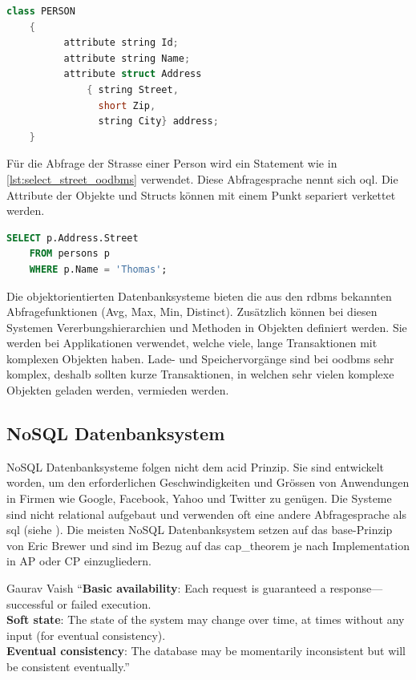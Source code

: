 \begin{lstlisting}[language=C++, caption=Objektdefinition in objektorientierem Datenbanksystem, label=lst:table_definition_oodbms]  
    class PERSON
    {
          attribute string Id;
          attribute string Name;
          attribute struct Address
              { string Street,
                short Zip,
                string City} address;
    }
\end{lstlisting}

Für die Abfrage der Strasse einer Person wird ein Statement wie in \autoref{lst:select_street_oodbms} verwendet. Diese Abfragesprache nennt
sich \gls{oql}. Die Attribute der Objekte und Structs können mit einem Punkt separiert verkettet werden.

\begin{lstlisting}[language=SQL, caption=Abfrage in objektorientierem Datenbanksystem, label=lst:select_street_oodbms]  
    SELECT p.Address.Street
    FROM persons p
    WHERE p.Name = 'Thomas';
\end{lstlisting}

Die objektorientierten Datenbanksysteme bieten die aus den \gls{rdbms} bekannten Abfragefunktionen (Avg, Max, Min, Distinct). 
Zusätzlich können bei diesen Systemen Vererbungshierarchien und Methoden in Objekten definiert werden. Sie werden bei Applikationen verwendet,
welche viele, lange Transaktionen mit komplexen Objekten haben. Lade- und Speichervorgänge sind bei \gls{oodbms} sehr komplex, deshalb 
sollten kurze Transaktionen, in welchen sehr vielen komplexe Objekten geladen werden, vermieden werden.

\subsection{NoSQL Datenbanksystem}\label{no_sql_db}
NoSQL Datenbanksysteme folgen nicht dem \gls{acid} Prinzip. Sie sind entwickelt worden, um den erforderlichen Geschwindigkeiten und Grössen von Anwendungen in Firmen wie Google, 
Facebook, Yahoo und Twitter zu genügen. Die Systeme sind nicht relational aufgebaut und verwenden oft eine andere Abfragesprache als \gls{sql} (siehe \cite{vaish2013getting}). 
Die meisten NoSQL Datenbanksystem setzen auf das \gls{base}-Prinzip von Eric Brewer und sind im Bezug auf das \gls{cap_theorem} je nach Implementation in AP oder CP einzugliedern.

\begin{myQuote}{Gaurav Vaish \cite{vaish2013getting}}
"`\textbf{Basic availability}: Each request is guaranteed a response—successful or failed execution.\\
\textbf{Soft state}: The state of the system may change over time, at times without any input (for eventual consistency).\\
\textbf{Eventual consistency}: The database may be momentarily inconsistent but will be consistent eventually."'
\end{myQuote}

